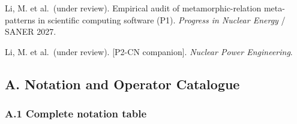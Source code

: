 \documentclass[review,12pt,authoryear]{elsarticle}
\begin{document}
Li, M. et al.~(under review). Empirical audit of metamorphic-relation
meta-patterns in scientific computing software (P1). \emph{Progress in
Nuclear Energy} / SANER 2027.

Li, M. et al.~(under review). {[}P2-CN companion{]}. \emph{Nuclear Power
Engineering}.

\appendix

\subsection{A. Notation and Operator
Catalogue}\label{a.-notation-and-operator-catalogue}

\subsubsection{A.1 Complete notation
table}\label{a.1-complete-notation-table}
\end{document}
